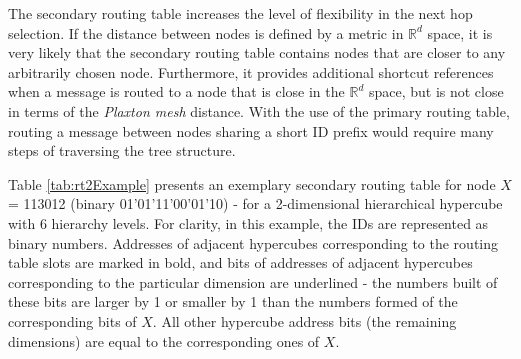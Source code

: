The secondary routing table increases the level of flexibility in the next hop selection. If the distance between nodes is defined by a metric in $\mathbb{R}^d$ space, it is very likely that the secondary routing table contains nodes that are closer to any arbitrarily chosen node. Furthermore, it provides additional shortcut references when a message is routed to a node that is close in the $\mathbb{R}^d$ space, but is not close in terms of the \emph{Plaxton mesh} distance. With the use of the primary routing table, routing a message between nodes sharing a short ID prefix would require many steps of traversing the tree structure.

Table \ref{tab:rt2Example} presents an exemplary secondary routing table for node $X$ = 113012 (binary 01'01'11'00'01'10) - for a 2-dimensional hierarchical hypercube with 6 hierarchy levels. For clarity, in this example, the IDs are represented as binary numbers. Addresses of adjacent hypercubes corresponding to the routing table slots are marked in bold, and bits of addresses of adjacent hypercubes corresponding to the particular dimension are underlined - the numbers built of these bits are larger by 1 or smaller by 1 than the numbers formed of the corresponding bits of $X$. All other hypercube address bits (the remaining dimensions) are equal to the corresponding ones of $X$.

